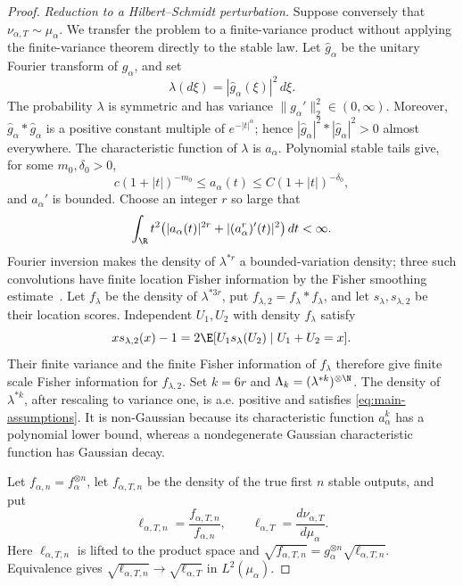 \begin{proof}
\emph{Reduction to a Hilbert--Schmidt perturbation.}
Suppose conversely that \(\nu_{\alpha,T}\sim\mu_\alpha\).
We transfer the problem to a finite-variance product without applying the
finite-variance theorem directly to the stable law.
Let \(\widehat g_\alpha\) be the unitary Fourier transform of \(g_\alpha\),
and set
\[
 \lambda(d\xi)=|\widehat g_\alpha(\xi)|^2\,d\xi.
\]
The probability \(\lambda\) is symmetric and has variance
\(\|g_\alpha'\|_2^2\in(0,\infty)\).
Moreover, \(\widehat g_\alpha*\widehat g_\alpha\) is a positive constant multiple of
\(e^{-|t|^\alpha}\); hence
\(|\widehat g_\alpha|^2*|\widehat g_\alpha|^2>0\) almost everywhere.
The characteristic function of \(\lambda\) is \(a_\alpha\).
Polynomial stable tails give, for some \(m_0,\delta_0>0\),
\[
 c(1+|t|)^{-m_0}\le a_\alpha(t)
 \le C(1+|t|)^{-\delta_0},
\]
and \(a_\alpha'\) is bounded.
Choose an integer \(r\) so large that
\[
 \int_\R t^2\bigl(|a_\alpha(t)|^{2r}
                 +|(a_\alpha^r)'(t)|^2\bigr)\,dt<\infty.
\]
Fourier inversion makes the density of \(\lambda^{*r}\) a bounded-variation
density; three such convolutions have finite location Fisher information by
the Fisher smoothing estimate~\cite{bobkov2014stable}.
Let \(f_\lambda\) be the density of \(\lambda^{*3r}\), put
\(f_{\lambda,2}=f_\lambda*f_\lambda\), and let
\(s_\lambda,s_{\lambda,2}\) be their location scores.
Independent \(U_1,U_2\) with density \(f_\lambda\) satisfy
\[
 x s_{\lambda,2}(x)-1
 =2\E[U_1s_\lambda(U_2)\mid U_1+U_2=x].
\]
Their finite variance and the finite Fisher information of \(f_\lambda\)
therefore
give finite scale Fisher information for \(f_{\lambda,2}\).
Set \(k=6r\) and \(\Lambda_k=(\lambda^{*k})^{\otimes\N}\).
The density of \(\lambda^{*k}\), after
rescaling to variance one, is a.e. positive and satisfies
\eqref{eq:main-assumptions}.
It is non-Gaussian because its characteristic function
\(a_\alpha^k\) has a polynomial lower bound, whereas a nondegenerate
Gaussian characteristic function has Gaussian decay.

Let \(f_{\alpha,n}=f_\alpha^{\otimes n}\), let \(f_{\alpha,T,n}\) be the
density of the true first \(n\) stable outputs, and put
\[
 \ell_{\alpha,T,n}=\frac{f_{\alpha,T,n}}{f_{\alpha,n}},
 \qquad
 \ell_{\alpha,T}=\frac{d\nu_{\alpha,T}}{d\mu_\alpha}.
\]
Here \(\ell_{\alpha,T,n}\) is lifted to the product space and
\(\sqrt{f_{\alpha,T,n}}
  =g_\alpha^{\otimes n}\sqrt{\ell_{\alpha,T,n}}\).
Equivalence gives
\(\sqrt{\ell_{\alpha,T,n}}\to\sqrt{\ell_{\alpha,T}}\)
in \(L^2(\mu_\alpha)\).


\end{proof}
